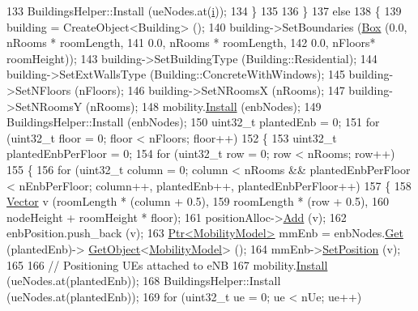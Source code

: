 \begin{DoxyCode}
133           BuildingsHelper::Install (ueNodes.at(\hyperlink{bernuolliDistribution_8m_a6f6ccfcf58b31cb6412107d9d5281426}{i}));
134         \}
135 
136     \}
137   \textcolor{keywordflow}{else}
138     \{
139       building = CreateObject<Building> ();
140       building->SetBoundaries (\hyperlink{classns3_1_1Box}{Box} (0.0, nRooms * roomLength,
141                                     0.0, nRooms * roomLength,
142                                     0.0, nFloors* roomHeight));
143       building->SetBuildingType (Building::Residential);
144       building->SetExtWallsType (Building::ConcreteWithWindows);
145       building->SetNFloors (nFloors);
146       building->SetNRoomsX (nRooms);
147       building->SetNRoomsY (nRooms);
148       mobility.\hyperlink{classns3_1_1MobilityHelper_a07737960ee95c0777109cf2994dd97ae}{Install} (enbNodes);
149       BuildingsHelper::Install (enbNodes);
150       uint32\_t plantedEnb = 0;
151       \textcolor{keywordflow}{for} (uint32\_t floor = 0; floor < nFloors; floor++)
152         \{
153           uint32\_t plantedEnbPerFloor = 0;
154           \textcolor{keywordflow}{for} (uint32\_t row = 0; row < nRooms; row++)
155             \{
156               \textcolor{keywordflow}{for} (uint32\_t column = 0; column < nRooms && plantedEnbPerFloor < nEnbPerFloor; column++, 
      plantedEnb++, plantedEnbPerFloor++)
157                 \{
158                   \hyperlink{classns3_1_1Vector3D_a7e59b47bc94c9cb1dadff68c1d0112d8}{Vector} v (roomLength * (column + 0.5),
159                             roomLength * (row + 0.5),
160                             nodeHeight + roomHeight * floor);
161                   positionAlloc->\hyperlink{classns3_1_1ListPositionAllocator_a460e82f015ac012a73ba0ea0cccb3486}{Add} (v);
162                   enbPosition.push\_back (v);
163                   \hyperlink{classns3_1_1Ptr}{Ptr<MobilityModel>} mmEnb = enbNodes.\hyperlink{classns3_1_1NodeContainer_a9ed96e2ecc22e0f5a3d4842eb9bf90bf}{Get} (plantedEnb)->
      \hyperlink{classns3_1_1Object_a13e18c00017096c8381eb651d5bd0783}{GetObject}<\hyperlink{classns3_1_1MobilityModel}{MobilityModel}> ();
164                   mmEnb->\hyperlink{classns3_1_1MobilityModel_ac584b3d5a309709d2f13ed6ada1e7640}{SetPosition} (v);
165 
166                   \textcolor{comment}{// Positioning UEs attached to eNB}
167                   mobility.\hyperlink{classns3_1_1MobilityHelper_a07737960ee95c0777109cf2994dd97ae}{Install} (ueNodes.at(plantedEnb));
168                   BuildingsHelper::Install (ueNodes.at(plantedEnb));
169                   \textcolor{keywordflow}{for} (uint32\_t ue = 0; ue < nUe; ue++)

\end{DoxyCode}
